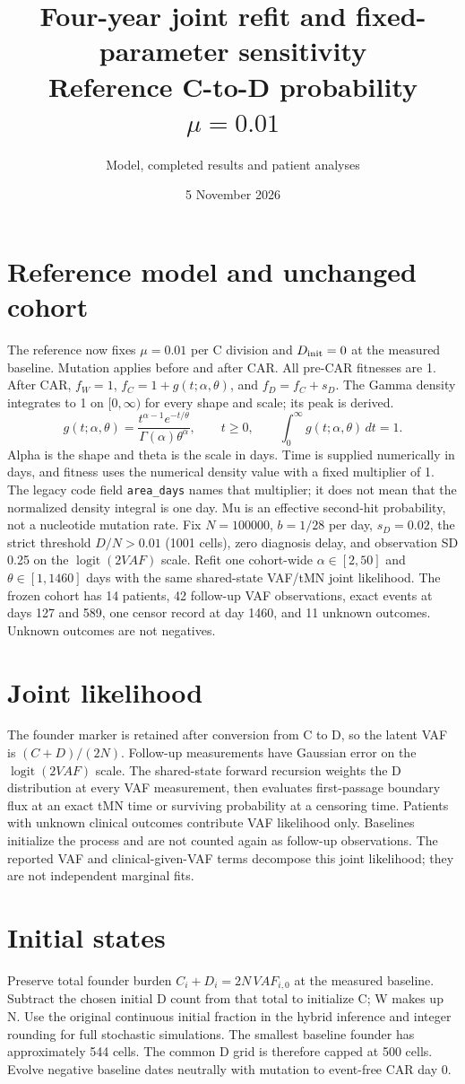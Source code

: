 \documentclass[11pt]{article}
\title{Four-year joint refit and fixed-parameter sensitivity\\Reference C-to-D probability $\mu=0.01$}
\author{Model, completed results and patient analyses}\date{5 November 2026}
\begin{document}
\maketitle
\section{Reference model and unchanged cohort}
The reference now fixes $\mu=0.01$ per C division and $D_{\rm init}=0$ at the measured baseline. Mutation applies before and after CAR. All pre-CAR fitnesses are 1. After CAR, $f_W=1$, $f_C=1+g(t;\alpha,\theta)$, and $f_D=f_C+s_D$. The Gamma density integrates to 1 on $[0,\infty)$ for every shape and scale; its peak is derived.
\[
g(t;\alpha,\theta)=\frac{t^{\alpha-1}e^{-t/\theta}}{\Gamma(\alpha)\theta^\alpha},\qquad t\geq0,\qquad
\int_0^\infty g(t;\alpha,\theta)\,dt=1.
\]
Alpha is the shape and theta is the scale in days. Time is supplied numerically in days, and fitness uses the numerical density value with a fixed multiplier of 1. The legacy code field \texttt{area\_days} names that multiplier; it does not mean that the normalized density integral is one day. Mu is an effective second-hit probability, not a nucleotide mutation rate.
Fix $N=100000$, $b=1/28$ per day, $s_D=0.02$, the strict threshold $D/N>0.01$ (1001 cells), zero diagnosis delay, and observation SD 0.25 on the $\operatorname{logit}(2VAF)$ scale.
Refit one cohort-wide $\alpha\in[2,50]$ and $\theta\in[1,1460]$ days with the same shared-state VAF/tMN joint likelihood.
The frozen cohort has 14 patients, 42 follow-up VAF observations, exact events at days 127 and 589, one censor record at day 1460, and 11 unknown outcomes. Unknown outcomes are not negatives.
\section{Joint likelihood}
The founder marker is retained after conversion from C to D, so the latent VAF is $(C+D)/(2N)$. Follow-up measurements have Gaussian error on the $\operatorname{logit}(2VAF)$ scale. The shared-state forward recursion weights the D distribution at every VAF measurement, then evaluates first-passage boundary flux at an exact tMN time or surviving probability at a censoring time. Patients with unknown clinical outcomes contribute VAF likelihood only. Baselines initialize the process and are not counted again as follow-up observations. The reported VAF and clinical-given-VAF terms decompose this joint likelihood; they are not independent marginal fits.
\section{Initial states}
Preserve total founder burden $C_i+D_i=2N\,VAF_{i,0}$ at the measured baseline. Subtract the chosen initial D count from that total to initialize C; W makes up N. Use the original continuous initial fraction in the hybrid inference and integer rounding for full stochastic simulations.
The smallest baseline founder has approximately 544 cells. The common D grid is therefore capped at 500 cells. Evolve negative baseline dates neutrally with mutation to event-free CAR day 0.
\end{document}
